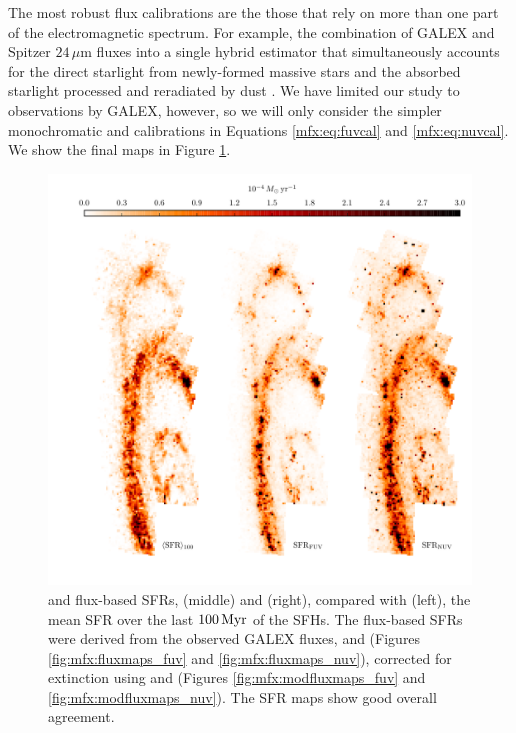 The most robust flux calibrations are the those that rely on more than one part
of the electromagnetic spectrum. For example, the combination of GALEX \fuv{}
and Spitzer $24\,\mu\mathrm{m}$ fluxes into a single hybrid estimator that
simultaneously accounts for the direct starlight from newly-formed massive
stars and the absorbed starlight processed and reradiated by dust
\citep[e.g.,][]{Leroy:2012}. We have limited our study to observations by
GALEX, however, so we will only consider the simpler monochromatic \fuv{} and
\nuv{} calibrations in Equations \ref{mfx:eq:fuvcal} and \ref{mfx:eq:nuvcal}.
We show the final \sfrx{} maps in Figure \ref{fig:mfx:sfrmaps1}.


\begin{figure}
\centering
\includegraphics[width=\textwidth]{m31flux-figures/sfrmaps1.pdf}
\caption[SFR maps from estimates based on observed fluxes compared with the
    mean SFR map from the SFHs.]{\fuv{} and \nuv{} flux-based SFRs, \sfrfuv{}
    (middle) and \sfrnuv{} (right), compared with \sfroneh{} (left), the mean
    SFR over the last $100\,\mathrm{Myr}$ of the SFHs. The flux-based SFRs were derived
    from the observed GALEX fluxes, \fuvobs{} and \nuvobs{} (Figures
    \ref{fig:mfx:fluxmaps_fuv} and \ref{fig:mfx:fluxmaps_nuv}), corrected for
    extinction using \afuv{} and \anuv{} (Figures \ref{fig:mfx:modfluxmaps_fuv}
    and \ref{fig:mfx:modfluxmaps_nuv}). The SFR maps show good overall
    agreement.
}
\label{fig:mfx:sfrmaps1}
\end{figure}


